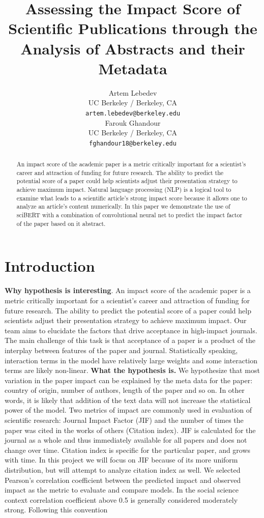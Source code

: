 \documentclass[11pt]{article}
\title{Assessing the Impact Score of Scientific Publications through the Analysis of Abstracts and their Metadata}
\author{Artem Lebedev\\
  UC Berkeley / Berkeley, CA \\
  \texttt{artem.lebedev@berkeley.edu} \\\And
 Farouk Ghandour \\
  UC Berkeley / Berkeley, CA \\
  \texttt{fghandour18@berkeley.edu} \\}
\begin{document}
\maketitle
\begin{abstract}
An impact score of the academic paper is a metric critically important for a scientist's career and attraction of funding for future research. The ability to predict the potential score of a paper could help scientists adjust their presentation strategy to achieve maximum impact. Natural language processing (NLP) is a logical tool to examine what leads to a scientific article's strong impact score because it allows one to analyze an article’s content numerically. In this paper we demonstrate the use of sciBERT with a combination of convolutional neural net to predict the impact factor of the paper based on it abstract.
\end{abstract}

\section{Introduction}
\textbf{Why hypothesis is interesting}. An impact score of the academic paper is a metric critically important for a scientist's career and attraction of funding for future research. The ability to predict the potential score of a paper could help scientists adjust their presentation strategy to achieve maximum impact. Our team aims to elucidate the factors that drive acceptance in high-impact journals. The main challenge of this task is that acceptance of a paper is a product of the interplay between  features of the paper and journal. Statistically speaking, interaction terms in the model have relatively large weights and some interaction terms are likely non-linear.
\textbf{What the hypothesis is.} We hypothesize that most variation in the paper impact can be explained by the meta data for the paper: country of origin, number of authors, length of the paper and so on. In other words, it is likely that addition of the text data will not increase the statistical power of the model. Two metrics of impact are commonly used in evaluation of scientific research: Journal Impact Factor (JIF) and the number of times the paper was cited in the works of others (Citation index). JIF is calculated for the journal as a whole and thus immediately available for all papers and does not change over time. Citation index is specific for the particular paper, and grows with time. In this project we will focus on JIF because of its more uniform distribution, but will attempt to analyze citation index as well. 
We selected Pearson's correlation coefficient between the predicted impact and observed impact as the metric to evaluate and compare models. In the social science context correlation coefficient above 0.5 is generally considered moderately strong\citep{KahnemanDaniel2021N:af}. Following this convention  
\end{document}
